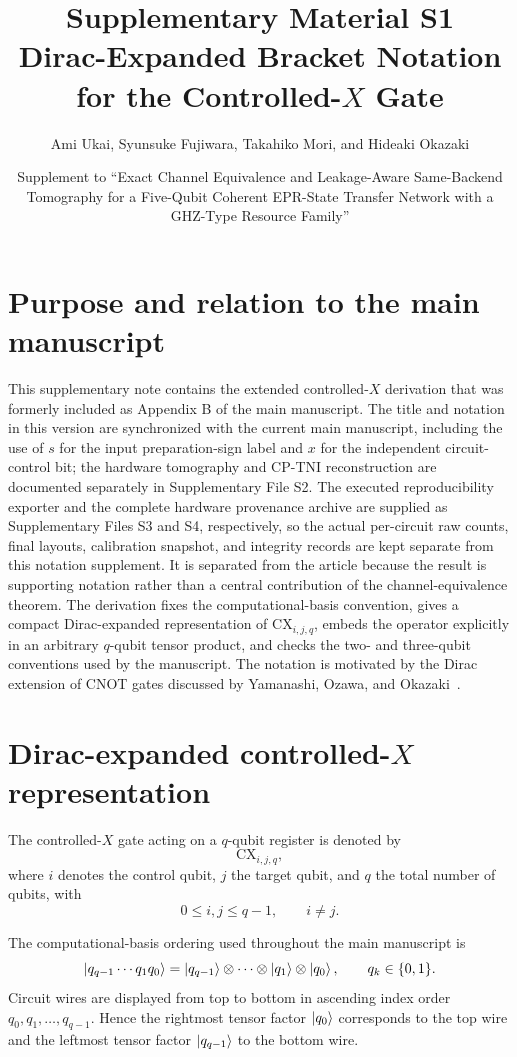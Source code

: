 \documentclass[11pt,a4paper]{article}
\title{Supplementary Material S1\\[1mm]
\large Dirac-Expanded Bracket Notation for the Controlled-$X$ Gate}
\author{Ami Ukai, Syunsuke Fujiwara, Takahiko Mori, and Hideaki Okazaki}
\date{Supplement to ``Exact Channel Equivalence and Leakage-Aware Same-Backend Tomography for a Five-Qubit Coherent EPR-State Transfer Network with a GHZ-Type Resource Family''}
\newcommand{\CX}{\mathrm{CX}}
\begin{document}
\maketitle

\section*{Purpose and relation to the main manuscript}
This supplementary note contains the extended controlled-$X$ derivation that was formerly included as Appendix B of the main manuscript.  The title and notation in this version are synchronized with the current main manuscript, including the use of $s$ for the input preparation-sign label and $x$ for the independent circuit-control bit; the hardware tomography and CP-TNI reconstruction are documented separately in Supplementary File S2.  The executed reproducibility exporter and the complete hardware provenance archive are supplied as Supplementary Files S3 and S4, respectively, so the actual per-circuit raw counts, final layouts, calibration snapshot, and integrity records are kept separate from this notation supplement.  It is separated from the article because the result is supporting notation rather than a central contribution of the channel-equivalence theorem.  The derivation fixes the computational-basis convention, gives a compact Dirac-expanded representation of $\CX_{i,j,q}$, embeds the operator explicitly in an arbitrary $q$-qubit tensor product, and checks the two- and three-qubit conventions used by the manuscript.  The notation is motivated by the Dirac extension of CNOT gates discussed by Yamanashi, Ozawa, and Okazaki~\cite{Yamanashi2023}.

\section{Dirac-expanded controlled-$X$ representation}

The controlled-$X$ gate acting on a $q$-qubit register is denoted by
\begin{equation}
\boxed{\CX_{i,j,q}},
\end{equation}
where $i$ denotes the control qubit, $j$ the target qubit, and $q$ the total number of qubits, with
\begin{equation}
0\le i,j\le q-1,\qquad i\neq j.
\end{equation}

The computational-basis ordering used throughout the main manuscript is
\begin{equation}
\ket{q_{q-1}\cdots q_1q_0}
=
\ket{q_{q-1}}\otimes\cdots\otimes\ket{q_1}\otimes\ket{q_0},
\qquad q_k\in\{0,1\}.
\label{eq:Sordering}
\end{equation}
Circuit wires are displayed from top to bottom in ascending index order $q_0,q_1,\ldots,q_{q-1}$.  Hence the rightmost tensor factor $\ket{q_0}$ corresponds to the top wire and the leftmost tensor factor $\ket{q_{q-1}}$ to the bottom wire.
\end{document}
